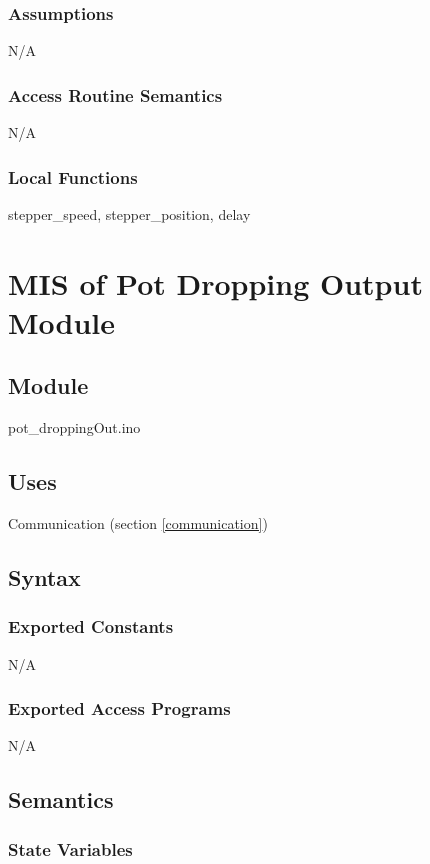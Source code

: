 \documentclass[12pt, titlepage]{article}
\begin{document}
\subsubsection{Assumptions}

N/A

\subsubsection{Access Routine Semantics}

N/A

\subsubsection{Local Functions}

stepper\_speed, stepper\_position, delay

  \section{MIS of Pot Dropping Output Module} \label{potdroppingOutput} 



\subsection{Module}
pot\_droppingOut.ino

\subsection{Uses}
Communication (section \ref{communication})

\subsection{Syntax}
\subsubsection{Exported Constants}
N/A
\subsubsection{Exported Access Programs}

N/A

\subsection{Semantics}
\subsubsection{State Variables}
\end{document}
